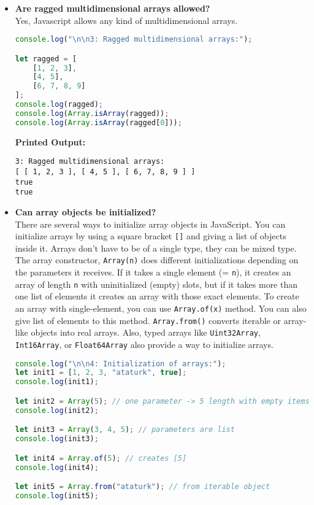 \documentclass{article}
\begin{document}
\begin{itemize}
\item \textbf{Are ragged multidimensional arrays allowed?} \\
Yes, Javascript allows any kind of multidimensional arrays.
\begin{lstlisting}[language=JavaScript]
console.log("\n\n3: Ragged multidimensional arrays:");

let ragged = [
    [1, 2, 3],
    [4, 5],
    [6, 7, 8, 9]
];
console.log(ragged);
console.log(Array.isArray(ragged));
console.log(Array.isArray(ragged[0]));
\end{lstlisting}
\textbf{Printed Output:}
\begin{verbatim}
3: Ragged multidimensional arrays:
[ [ 1, 2, 3 ], [ 4, 5 ], [ 6, 7, 8, 9 ] ]
true
true
\end{verbatim}


\item \textbf{Can array objects be initialized?} \\
There are several ways to initialize array objects in JavaScript. You can initialize arrays by using a square bracket \texttt{[]} and giving a list of objects inside it. Arrays don't have to be of a single type, they can be mixed type. The array constructor, \texttt{Array(n)} does different initializations depending on the parameters it receives. If it takes a single element (= \texttt{n}), it creates an array of length \texttt{n} with uninitialized (empty) slots, but if it takes more than one list of elements it creates an array with those exact elements. To create an array with single-element, you can use \texttt{Array.of(x)} method. You can also give list of elements to this method. \texttt{Array.from()} converts iterable or array-like objects into real arrays. Also, typed arrays like \texttt{Uint32Array}, \texttt{Int16Array}, or \texttt{Float64Array} also provide a way to initialize arrays.

\begin{lstlisting}[language=JavaScript]
console.log("\n\n4: Initialization of arrays:");
let init1 = [1, 2, 3, "ataturk", true];
console.log(init1);

let init2 = Array(5); // one parameter -> 5 length with empty items.
console.log(init2);

let init3 = Array(3, 4, 5); // parameters are list 
console.log(init3);

let init4 = Array.of(5); // creates [5]
console.log(init4);

let init5 = Array.from("ataturk"); // from iterable object
console.log(init5);


\end{lstlisting}
\end{itemize}
\end{document}
